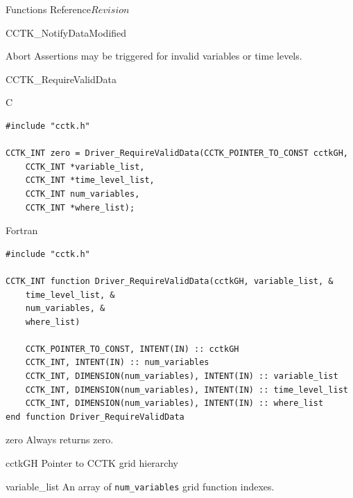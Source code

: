 \begin{cactuspart}{ Functions Reference}{}{$Revision$}
\begin{FunctionDescription}{CCTK\_NotifyDataModified}
\begin{ErrorSection}
\begin{Error}{Abort}
Assertions may be triggered for invalid variables or time levels.
\end{Error}
\end{ErrorSection}
\end{FunctionDescription}

\begin{FunctionDescription}{CCTK\_RequireValidData}
\label{CCTK-gRequireValidData}
\begin{SynopsisSection}
\begin{Synopsis}{C}
\begin{verbatim}
#include "cctk.h"

CCTK_INT zero = Driver_RequireValidData(CCTK_POINTER_TO_CONST cctkGH,
    CCTK_INT *variable_list,
    CCTK_INT *time_level_list,
    CCTK_INT num_variables,
    CCTK_INT *where_list);

\end{verbatim}
\end{Synopsis}
\begin{Synopsis}{Fortran}
\begin{verbatim}
#include "cctk.h"

CCTK_INT function Driver_RequireValidData(cctkGH, variable_list, &
    time_level_list, &
    num_variables, &
    where_list)

    CCTK_POINTER_TO_CONST, INTENT(IN) :: cctkGH
    CCTK_INT, INTENT(IN) :: num_variables
    CCTK_INT, DIMENSION(num_variables), INTENT(IN) :: variable_list
    CCTK_INT, DIMENSION(num_variables), INTENT(IN) :: time_level_list
    CCTK_INT, DIMENSION(num_variables), INTENT(IN) :: where_list
end function Driver_RequireValidData
\end{verbatim}
\end{Synopsis}
\end{SynopsisSection}

\begin{ResultSection}
\begin{Result}{zero}
Always returns zero.
\end{Result}
\end{ResultSection}

\begin{ParameterSection}
\begin{Parameter}{cctkGH}
Pointer to CCTK grid hierarchy
\end{Parameter}

\begin{Parameter}{variable\_list}
An array of \texttt{num\_variables} grid function indexes.
\end{Parameter}


\end{ParameterSection}
\end{FunctionDescription}
\end{cactuspart}

